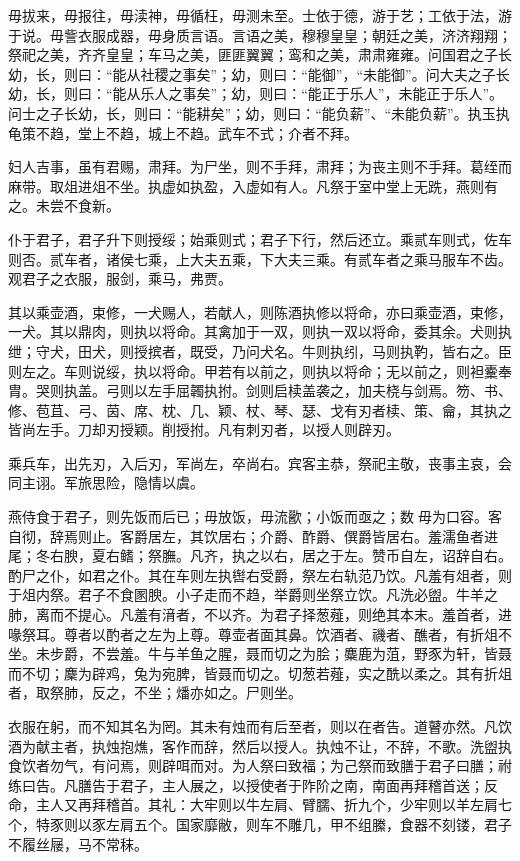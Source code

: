 \documentclass[]{article}
\begin{document}
毋拔来，毋报往，毋渎神，毋循枉，毋测未至。士依于德，游于艺；工依于法，游于说。毋訾衣服成器，毋身质言语。言语之美，穆穆皇皇；朝廷之美，济济翔翔；祭祀之美，齐齐皇皇；车马之美，匪匪翼翼；鸾和之美，肃肃雍雍。问国君之子长幼，长，则曰：``能从社稷之事矣''；幼，则曰：``能御''，``未能御''。问大夫之子长幼，长，则曰：``能从乐人之事矣''；幼，则曰：``能正于乐人''，未能正于乐人''。问士之子长幼，长，则曰：``能耕矣''；幼，则曰：``能负薪''、``未能负薪''。执玉执龟策不趋，堂上不趋，城上不趋。武车不式；介者不拜。

妇人吉事，虽有君赐，肃拜。为尸坐，则不手拜，肃拜；为丧主则不手拜。葛绖而麻带。取俎进俎不坐。执虚如执盈，入虚如有人。凡祭于室中堂上无跣，燕则有之。未尝不食新。

仆于君子，君子升下则授绥；始乘则式；君子下行，然后还立。乘贰车则式，佐车则否。贰车者，诸侯七乘，上大夫五乘，下大夫三乘。有贰车者之乘马服车不齿。观君子之衣服，服剑，乘马，弗贾。

其以乘壶酒，束修，一犬赐人，若献人，则陈酒执修以将命，亦曰乘壶酒，束修，一犬。其以鼎肉，则执以将命。其禽加于一双，则执一双以将命，委其余。犬则执绁；守犬，田犬，则授摈者，既受，乃问犬名。牛则执纼，马则执靮，皆右之。臣则左之。车则说绥，执以将命。甲若有以前之，则执以将命；无以前之，则袒櫜奉胄。哭则执盖。弓则以左手屈韣执拊。剑则启椟盖袭之，加夫桡与剑焉。笏、书、修、苞苴、弓、茵、席、枕、几、颖、杖、琴、瑟、戈有刃者椟、策、龠，其执之皆尚左手。刀却刃授颖。削授拊。凡有刺刃者，以授人则辟刃。

乘兵车，出先刃，入后刃，军尚左，卒尚右。宾客主恭，祭祀主敬，丧事主哀，会同主诩。军旅思险，隐情以虞。

燕侍食于君子，则先饭而后已；毋放饭，毋流歠；小饭而亟之；数毋为口容。客自彻，辞焉则止。客爵居左，其饮居右；介爵、酢爵、僎爵皆居右。羞濡鱼者进尾；冬右腴，夏右鳍；祭膴。凡齐，执之以右，居之于左。赞币自左，诏辞自右。酌尸之仆，如君之仆。其在车则左执辔右受爵，祭左右轨范乃饮。凡羞有俎者，则于俎内祭。君子不食圂腴。小子走而不趋，举爵则坐祭立饮。凡洗必盥。牛羊之肺，离而不提心。凡羞有湇者，不以齐。为君子择葱薤，则绝其本末。羞首者，进喙祭耳。尊者以酌者之左为上尊。尊壶者面其鼻。饮酒者、禨者、醮者，有折俎不坐。未步爵，不尝羞。牛与羊鱼之腥，聂而切之为脍；麋鹿为菹，野豕为轩，皆聂而不切；麇为辟鸡，兔为宛脾，皆聂而切之。切葱若薤，实之酰以柔之。其有折俎者，取祭肺，反之，不坐；燔亦如之。尸则坐。

衣服在躬，而不知其名为罔。其未有烛而有后至者，则以在者告。道瞽亦然。凡饮酒为献主者，执烛抱燋，客作而辞，然后以授人。执烛不让，不辞，不歌。洗盥执食饮者勿气，有问焉，则辟咡而对。为人祭曰致福；为己祭而致膳于君子曰膳；祔练曰告。凡膳告于君子，主人展之，以授使者于阼阶之南，南面再拜稽首送；反命，主人又再拜稽首。其礼：大牢则以牛左肩、臂臑、折九个，少牢则以羊左肩七个，特豕则以豕左肩五个。国家靡敝，则车不雕几，甲不组縢，食器不刻镂，君子不履丝屦，马不常秣。
\end{document}
